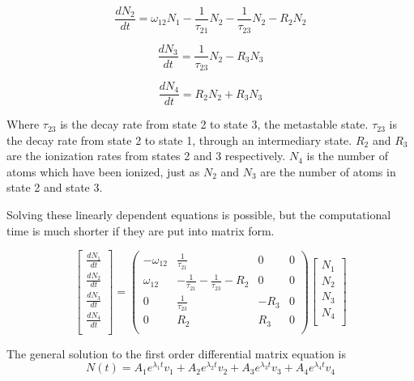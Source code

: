 \documentclass[prb,preprint]{revtex4-1}
\begin{document}
\begin{equation}
\label{RateEq2}
\frac{dN_2}{dt} = \omega_{12}N_1 -  \frac{1}{\tau_{21}}N_2 - \frac{1}{\tau_{23}}N_2 - R_2N_2
\end{equation}

\begin{equation}
\label{RateEq3}
\frac{dN_3}{dt} =  \frac{1}{\tau_{23}}N_2 - R_3N_3
\end{equation}

\begin{equation}
\label{RateEq4}
\frac{dN_4}{dt} = R_2N_2 + R_3N_3
\end{equation}

Where $\tau_{23}$ is the decay rate from state 2 to state 3, the metastable state. $\tau_{23}$ is the decay rate from state 2 to state 1, through an intermediary state. $R_2$ and $R_3$ are the ionization rates from states 2 and 3 respectively. $N_4$ is the number of atoms which have been ionized, just as $N_2$ and $N_3$ are the number of atoms in state 2 and state 3.

Solving these linearly dependent equations is possible, but the computational time is much shorter if they are put into matrix form.

\begin{equation}
\label{RateEqMatrix}
\begin{bmatrix}
	\frac{dN_1}{dt} \\
	\frac{dN_2}{dt} \\
	\frac{dN_3}{dt} \\
	\frac{dN_4}{dt} \\
\end{bmatrix}
=
\begin{pmatrix}
	-\omega_{12} & \frac{1}{\tau_{21}}  & 0 &  0   \\
	\omega_{12}  & -\frac{1}{\tau_{21}}- \frac{1}{\tau_{23}}-R_2 & 0 & 0 \\
	0  &  \frac{1}{\tau_{23}}  & - R_3 & 0 \\
	0  &  R_2  & R_3 & 0  \\
\end{pmatrix}
\begin{bmatrix}
	N_1 \\
	N_2 \\
	N_3 \\
	N_4 \\
\end{bmatrix}
\end{equation}

The general solution to the first order differential matrix equation is
\begin{equation}
\label{RateEqSol}
N(t) = A_1e^{\lambda_1 t} v_1 + A_2e^{\lambda_2 t} v_2 + A_3e^{\lambda_3 t} v_3 + A_4e^{\lambda_4 t} v_4 
\end{equation}
\end{document}
